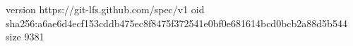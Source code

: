 version https://git-lfs.github.com/spec/v1
oid sha256:a6ae6d4ecf153cddb475ec8f8475f372541e0bf0e681614bcd0bcb2a88d5b544
size 9381
